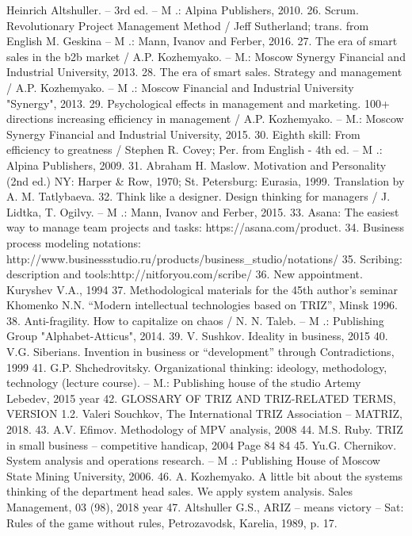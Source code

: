 Heinrich Altshuller. -- 3rd ed. -- M .: Alpina Publishers, 2010.
26. Scrum. Revolutionary Project Management Method / Jeff Sutherland;
trans. from English M. Geskina -- M .: Mann, Ivanov and Ferber, 2016.
27. The era of smart sales in the b2b market / A.P. Kozhemyako. -- M.: Moscow
Synergy Financial and Industrial University, 2013.
28. The era of smart sales. Strategy and management / A.P. Kozhemyako. -- M .:
Moscow Financial and Industrial University "Synergy", 2013.
29. Psychological effects in management and marketing. 100+ directions
increasing efficiency in management / A.P. Kozhemyako. -- M.: Moscow
Synergy Financial and Industrial University, 2015.
30. Eighth skill: From efficiency to greatness / Stephen R. Covey; Per. from English
- 4th ed. -- M .: Alpina Publishers, 2009.
31. Abraham H. Maslow. Motivation and Personality (2nd ed.) NY: Harper & Row,
1970; St. Petersburg: Eurasia, 1999. Translation by A. M. Tatlybaeva.
32. Think like a designer. Design thinking for managers / J. Lidtka, T.
Ogilvy. -- M .: Mann, Ivanov and Ferber, 2015.
33. Asana: The easiest way to manage team projects and tasks:
https://asana.com/product.
34. Business process modeling notations:
http://www.businessstudio.ru/products/business_studio/notations/
35. Scribing: description and tools:http://nitforyou.com/scribe/
36. New appointment. Kuryshev V.A., 1994
37. Methodological materials for the 45th author’s seminar Khomenko N.N.
“Modern intellectual technologies based on TRIZ”, Minsk
1996.
38. Anti-fragility. How to capitalize on chaos / N. N. Taleb. -- M .:
Publishing Group "Alphabet-Atticus", 2014.
39. V. Sushkov. Ideality in business, 2015
40. V.G. Siberians. Invention in business or “development” through
Contradictions, 1999
41. G.P. Shchedrovitsky. Organizational thinking: ideology, methodology,
technology (lecture course). -- M.: Publishing house of the studio Artemy Lebedev,
2015 year
42. GLOSSARY OF TRIZ AND TRIZ-RELATED TERMS, VERSION 1.2. Valeri
Souchkov, The International TRIZ Association -- MATRIZ, 2018.
43. A.V. Efimov. Methodology of MPV analysis, 2008
44. M.S. Ruby. TRIZ in small business -- competitive handicap, 2004
Page 84
84
45. Yu.G. Chernikov. System analysis and operations research. -- M .:
Publishing House of Moscow State Mining University, 2006.
46. ​​A. Kozhemyako. A little bit about the systems thinking of the department head
sales. We apply system analysis. Sales Management, 03 (98),
2018 year
47. Altshuller G.S., ARIZ -- means victory -- Sat: Rules of the game without rules,
Petrozavodsk, Karelia, 1989, p. 17.
